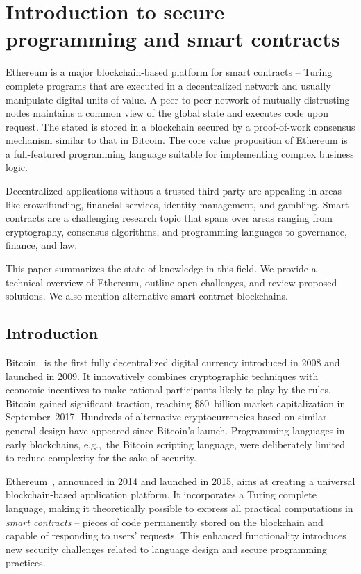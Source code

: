 \chapter{Introduction to secure programming and smart contracts}

\label{Chapter09Introcontracts}

Ethereum is a major blockchain-based platform for smart contracts -- Turing complete programs that are executed in a decentralized network and usually manipulate digital units of value.
A peer-to-peer network of mutually distrusting nodes maintains a common view of the global state and executes code upon request.
The stated is stored in a blockchain secured by a proof-of-work consensus mechanism similar to that in Bitcoin.
The core value proposition of Ethereum is a full-featured programming language suitable for implementing complex business logic.

Decentralized applications without a trusted third party are appealing in areas like crowdfunding, financial services, identity management, and gambling.
Smart contracts are a challenging research topic that spans over areas ranging from cryptography, consensus algorithms, and programming languages to governance, finance, and law.

This paper summarizes the state of knowledge in this field.
We provide a technical overview of Ethereum, outline open challenges, and review proposed solutions.
We also mention alternative smart contract blockchains.

\section{Introduction}

Bitcoin~\cite{Nakamoto2008} is the first fully decentralized digital currency introduced in 2008 and launched in 2009.
It innovatively combines cryptographic techniques with economic incentives to make rational participants likely to play by the rules.
Bitcoin gained significant traction, reaching \$80~billion market capitalization in September~2017.
Hundreds of alternative cryptocurrencies based on similar general design have appeared since Bitcoin's launch.
Programming languages in early blockchains, e.g.,~the Bitcoin scripting language, were deliberately limited to reduce complexity for the sake of security.

Ethereum~\cite{Buterin2014, Wood2014}, announced in 2014 and launched in 2015, aims at creating a universal blockchain-based application platform.
It incorporates a Turing complete language, making it theoretically possible to express all practical computations in \textit{smart contracts} -- pieces of code permanently stored on the blockchain and capable of responding to users' requests.
This enhanced functionality introduces new security challenges related to language design and secure programming practices.

